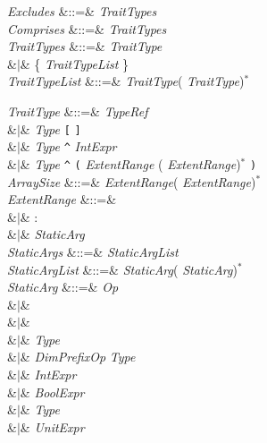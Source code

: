 \begin{GrammarTwo}
\emph{Excludes} &::=&  \emph{TraitTypes} \\
\emph{Comprises} &::=&  \emph{TraitTypes} \\

\emph{TraitTypes} &::=& \emph{TraitType} \\
&$|$& \{ \emph{TraitTypeList} \} \\
\emph{TraitTypeList} &::=& \emph{TraitType}(\EXP{,} \emph{TraitType})$^*$ \\

\end{GrammarTwo}

\begin{GrammarTwo}
\emph{TraitType}
&::=& \emph{TypeRef}\\
&$|$& \emph{Type} \texttt{[}  \texttt{]} \\
&$|$& \emph{Type} \verb+^+ \emph{IntExpr}\\
&$|$& \emph{Type} \verb+^+ \texttt{(} \emph{ExtentRange}
(\EXP{\times} \emph{ExtentRange})$^*$ \texttt{)}\\

\emph{ArraySize} &::=& \emph{ExtentRange}(\EXP{,} \emph{ExtentRange})$^*$ \\

\emph{ExtentRange}
&::=& 
\\
&$|$& \KWD:\\
&$|$& \emph{StaticArg} \\

\emph{StaticArgs}    &::=& \bTPl \emph{StaticArgList} \bTPr \\

\emph{StaticArgList} &::=& \emph{StaticArg}(\EXP{,} \emph{StaticArg})$^*$ \\

\emph{StaticArg} &::=&
\emph{Op} \\
&$|$&  \\
&$|$& \\
&$|$& \EXP{/}\emph{Type}\\
&$|$& \emph{DimPrefixOp} \emph{Type}\\
&$|$& \emph{IntExpr}\\
&$|$& \emph{BoolExpr}\\
&$|$& \emph{Type}\\
&$|$& \emph{UnitExpr}\\

\end{GrammarTwo}

